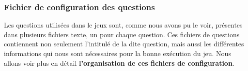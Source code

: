 \newpage
\subsubsection{Fichier de configuration des questions}

Les questions utilisées dans le jeux sont, comme nous avons pu le voir, présentes dans plusieurs fichiers texte, un pour chaque question.
\newline
Ces fichiers de questions contiennent non seulement l'intitulé de la dite question, mais aussi les différentes informations qui nous sont nécessaires pour la bonne exécution du jeu. Nous allons voir plus en détail \textbf{l'organisation de ces fichiers de configuration}.
\newline


